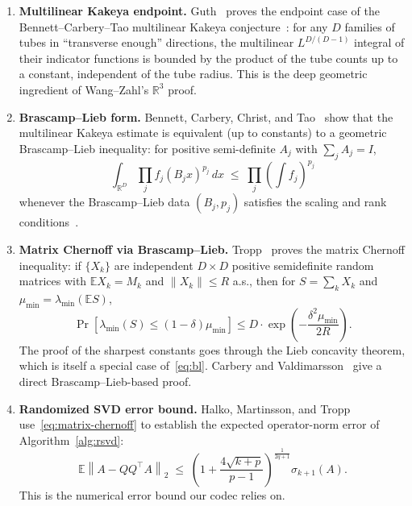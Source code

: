 \documentclass[11pt,a4paper]{article}
\theoremstyle{definition}
\theoremstyle{plain}
\newcommand{\R}{\mathbb{R}}
\newcommand{\E}{\mathbb{E}}
\newcommand{\norm}[1]{\left\lVert#1\right\rVert}
\begin{document}
\begin{enumerate}[leftmargin=*]
  \item \textbf{Multilinear Kakeya endpoint.} Guth~\cite{guth-endpoint} proves the endpoint case of the Bennett--Carbery--Tao multilinear Kakeya conjecture~\cite{bennett-carbery-tao}: for any $D$ families of tubes in ``transverse enough'' directions, the multilinear $L^{D/(D-1)}$ integral of their indicator functions is bounded by the product of the tube counts up to a constant, independent of the tube radius. This is the deep geometric ingredient of Wang--Zahl's $\R^3$ proof.

  \item \textbf{Brascamp--Lieb form.} Bennett, Carbery, Christ, and Tao~\cite{bennett-carbery-christ-tao} show that the multilinear Kakeya estimate is equivalent (up to constants) to a geometric Brascamp--Lieb inequality: for positive semi-definite $A_j$ with $\sum_j A_j = I$,
  \begin{equation}
  \label{eq:bl}
  \int_{\R^D} \prod_j f_j(B_j x)^{p_j} \, dx \;\leq\; \prod_j \left(\int f_j\right)^{p_j}
  \end{equation}
  whenever the Brascamp--Lieb data $(B_j, p_j)$ satisfies the scaling and rank conditions~\cite{carbery-valdimarsson}.

  \item \textbf{Matrix Chernoff via Brascamp--Lieb.} Tropp~\cite{tropp-matrix-chernoff} proves the matrix Chernoff inequality: if $\{X_k\}$ are independent $D \times D$ positive semidefinite random matrices with $\E X_k = M_k$ and $\norm{X_k} \leq R$ a.s., then for $S = \sum_k X_k$ and $\mu_{\min} = \lambda_{\min}(\E S)$,
  \begin{equation}
  \label{eq:matrix-chernoff}
  \Pr[\lambda_{\min}(S) \leq (1-\delta)\mu_{\min}] \leq D \cdot \exp\left(-\frac{\delta^2 \mu_{\min}}{2R}\right).
  \end{equation}
  The proof of the sharpest constants goes through the Lieb concavity theorem, which is itself a special case of~\eqref{eq:bl}. Carbery and Valdimarsson~\cite{carbery-valdimarsson} give a direct Brascamp--Lieb-based proof.

  \item \textbf{Randomized SVD error bound.} Halko, Martinsson, and Tropp~\cite[\S 10.4]{halko-martinsson-tropp} use~\eqref{eq:matrix-chernoff} to establish the expected operator-norm error of Algorithm~\ref{alg:rsvd}:
  \begin{equation}
  \label{eq:hmt-bound}
  \E \norm{A - QQ^\top A}_2 \;\leq\; \left(1 + \frac{4 \sqrt{k+p}}{p-1}\right)^{\frac{1}{2q+1}} \sigma_{k+1}(A).
  \end{equation}
  This is the numerical error bound our codec relies on.
\end{enumerate}
\end{document}
